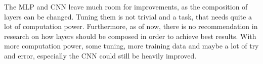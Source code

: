\documentclass[]{article}
\begin{document}
The MLP and CNN leave much room for improvements, as the composition of
layers can be changed. Tuning them is not trivial and a task, that needs
quite a lot of computation power. Furthermore, as of now, there is no
recommendation in research on how layers should be composed in order to
achieve best results. With more computation power, some tuning, more
training data and maybe a lot of try and error, especially the CNN could
still be heavily improved.
\end{document}
